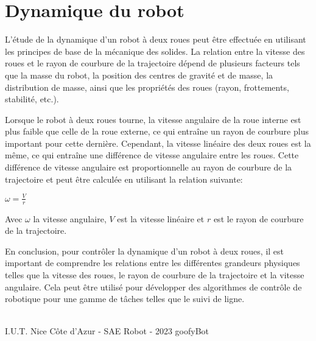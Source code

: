 \section{Dynamique du robot}
L'étude de la dynamique d'un robot à deux roues peut être effectuée en utilisant les principes de base de la mécanique des solides. La relation entre la vitesse des roues et le rayon de courbure de la trajectoire dépend de plusieurs facteurs tels que la masse du robot, la position des centres de gravité et de masse, la distribution de masse, ainsi que les propriétés des roues (rayon, frottements, stabilité, etc.).

Lorsque le robot à deux roues tourne, la vitesse angulaire de la roue interne est plus faible que celle de la roue externe, ce qui entraîne un rayon de courbure plus important pour cette dernière. Cependant, la vitesse linéaire des deux roues est la même, ce qui entraîne une différence de vitesse angulaire entre les roues. Cette différence de vitesse angulaire est proportionnelle au rayon de courbure de la trajectoire et peut être calculée en utilisant la relation suivante:

\begin{center}
    $\omega = \frac{V}{r}$
\end{center}

\noindent Avec $\omega$ la vitesse angulaire, $V$ est la vitesse linéaire et $r$ est le rayon de courbure de la trajectoire.

En conclusion, pour contrôler la dynamique d'un robot à deux roues, il est important de comprendre les relations entre les différentes grandeurs physiques telles que la vitesse des roues, le rayon de courbure de la trajectoire et la vitesse angulaire. Cela peut être utilisé pour développer des algorithmes de contrôle de robotique pour une gamme de tâches telles que le suivi de ligne.

\vfill
\noindent\makebox[\linewidth]{\rule{.8\paperwidth}{.6pt}}\\[0.2cm]
I.U.T. Nice Côte d'Azur - SAE Robot - 2023 \hfill goofyBot
\noindent\makebox[\linewidth]{\rule{.8\paperwidth}{.6pt}}
\newpage